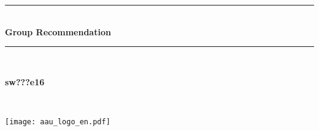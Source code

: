 \begin{titlepage}

\newcommand{\HRule}{\rule{\linewidth}{0.5mm}} %
\center%




\HRule \\[0.4cm]
{ \Huge \bfseries Group Recommendation}\\[0.4cm] %
\HRule \\[1.5cm]

\vfill %

\begin{minipage}[t]{0.4\textwidth}
\begin{flushleft} \large
\textbf{sw???e16}\\
\groupmembersbyfirstname{}
\end{flushleft}
\end{minipage}
~%
\begin{minipage}[t][][b]{0.4\textwidth}
\begin{flushright}
\hfill
\texttt{[image: aau\_logo\_en.pdf]}
\end{flushright}
\end{minipage}\\

\endcenter{}

\end{titlepage}
